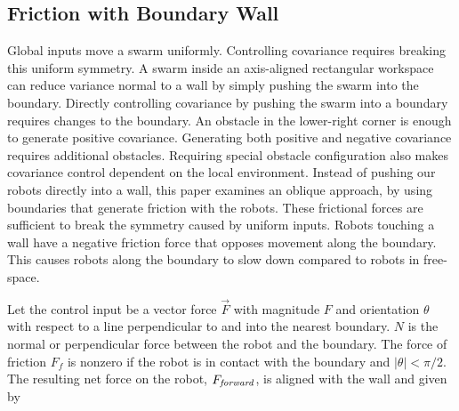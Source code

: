 \subsection{Friction with Boundary Wall}\label{subsec:WallFriction}
Global inputs move a swarm uniformly.  
Controlling covariance requires breaking this uniform symmetry.  A swarm inside an axis-aligned rectangular workspace can reduce variance normal to a wall by simply pushing the swarm into the boundary. Directly controlling covariance by pushing the swarm into a boundary requires changes to the boundary.  An obstacle in the lower-right corner is enough to generate positive covariance.  Generating both positive and negative covariance requires additional obstacles.  Requiring special obstacle configuration also makes covariance control dependent on the local environment. 
  Instead of pushing our robots directly into a wall, this paper examines an oblique approach, by using boundaries that generate friction with the robots.  These frictional forces are  sufficient to break the symmetry caused by uniform inputs.  Robots touching a wall have a negative friction force that opposes movement along the boundary.  This  causes robots along the boundary to slow down compared to robots in free-space. 

Let the control input be a vector force $\vec{F}$ with magnitude $F$ and orientation $\theta$ with respect to a line perpendicular to and into the nearest boundary. $N$ is the normal or perpendicular force between the robot and the boundary. The force of friction $F_f$ is nonzero if the robot is in contact with the boundary and  $|\theta| < \pi/2$. The resulting net force on the robot, $F_{\text{\emph{forward}}}$, is aligned with the wall and given by

